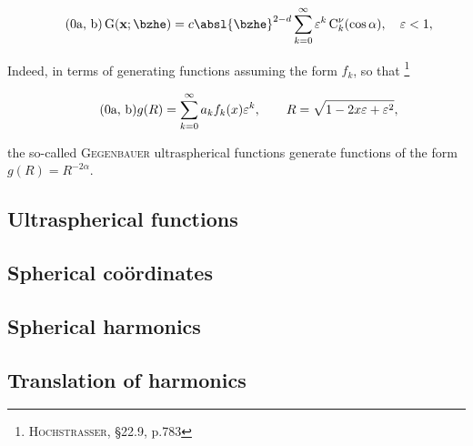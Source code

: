 \begin{subequations}
  \begin{equation}\tag{\theequation{a, b}}
    \green(\xvec; \bzhe) = c {\absl{\bzhe}}^{2-d} \sum_{k = 0}^{\infty} \varepsilon^k \gegenbauer_{k}^{\nu}(\cos{\alpha}), \quad \varepsilon < 1,
  \end{equation}
\end{subequations}

\noindent
Indeed, in terms of generating functions assuming the form $f_k$, so that%
\footnote{%
  \cite{abramowitz1965handbook} \textsc{Hochstrasser}, \S22.9, p.783
}

\begin{subequations}
  \begin{equation}\tag{\theequation{a, b}}
    g(R) = \sum_{k = 0}^{\infty} a_k f_k(x) \varepsilon^k, \qquad R = \sqrt{1 - 2x\varepsilon + \varepsilon^2},
  \end{equation}
\end{subequations}

\noindent
the so-called \textsc{Gegenbauer} ultraspherical functions generate functions of the form $g(R) = R^{-2\alpha}$.

\subsection{Ultraspherical functions}


\subsection{Spherical coördinates}


\subsection{Spherical harmonics}


\subsection{Translation of harmonics}

